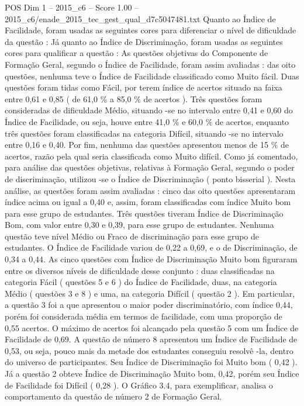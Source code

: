 \begin{textsample}{POS Dim 1 – 2015\_c6 – Score 1.00 – 2015\_c6/enade\_2015\_tec\_gest\_qual\_d7c5047481.txt}
Quanto ao Índice de Facilidade, foram usadas as seguintes cores para diferenciar o nível de dificuldade da questão : Já quanto ao Índice de Discriminação, foram usadas as seguintes cores para qualificar a questão : As questões objetivas do Componente de Formação Geral, segundo o Índice de Facilidade, foram assim avaliadas : das oito questões, nenhuma teve o Índice de Facilidade classificado como Muito fácil.
Duas questões foram tidas como Fácil, por terem índice de acertos situado na faixa entre 0,61 e 0,85 ( de 61,0 \% a 85,0 \% de acertos ).
Três questões foram consideradas de dificuldade Médio, situando -se no intervalo entre 0,41 e 0,60 do Índice de Facilidade, ou seja, houve entre 41,0 \% e 60,0 \% de acertos, enquanto três questões foram classificadas na categoria Difícil, situando -se no intervalo entre 0,16 e 0,40.
Por fim, nenhuma das questões apresentou menos de 15 \% de acertos, razão pela qual seria classificada como Muito difícil.
Como já comentado, para análise das questões objetivas, relativas à Formação Geral, segundo o poder de discriminação, utilizou -se o Índice de Discriminação ( ponto bisserial ).
Nesta análise, as questões foram assim avaliadas : cinco das oito questões apresentaram índice acima ou igual a 0,40 e, assim, foram classificadas com índice Muito bom para esse grupo de estudantes.
Três questões tiveram Índice de Discriminação Bom, com valor entre 0,30 e 0,39, para esse grupo de estudantes.
Nenhuma questão teve nível Médio ou Fraco de discriminação para esse grupo de estudantes.
O Índice de Facilidade variou de 0,22 a 0,69, e o de Discriminação, de 0,34 a 0,44.
As cinco questões com Índice de Discriminação Muito bom figuraram entre os diversos níveis de dificuldade desse conjunto : duas classificadas na categoria Fácil ( questões 5 e 6 ) do Índice de Facilidade, duas, na categoria Médio ( questões 3 e 8 ) e uma, na categoria Difícil ( questão 2 ).
Em particular, a questão 3 foi a que apresentou o maior poder discriminatório, com índice 0,44, porém foi considerada média em termos de facilidade, com uma proporção de 0,55 acertos.
O máximo de acertos foi alcançado pela questão 5 com um Índice de Facilidade de 0,69.
A questão de número 8 apresentou um Índice de Facilidade de 0,53, ou seja, pouco mais da metade dos estudantes conseguiu resolvê -la, dentro do universo de participantes.
Seu Índice de Discriminação foi Muito bom ( 0,42 ).
Já a questão 2 obteve Índice de Discriminação Muito bom, 0,42, porém seu Índice de Facilidade foi Difícil ( 0,28 ).
O Gráfico 3.4, para exemplificar, analisa o comportamento da questão de número 2 de Formação Geral.

\end{textsample}
